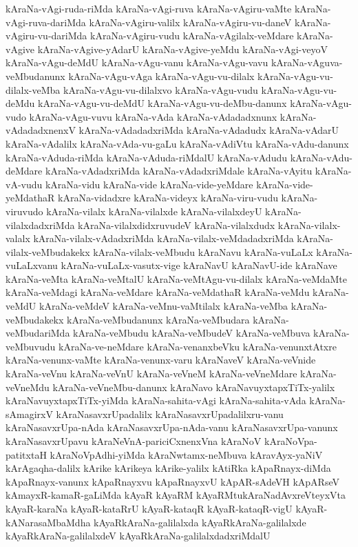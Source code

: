 {kAraNa-vAgi-ruda-riMda
kAraNa-vAgi-ruva
kAraNa-vAgiru-vaMte
kAraNa-vAgi-ruva-dariMda
kAraNa-vAgiru-valilx
kAraNa-vAgiru-vu-daneV
kAraNa-vAgiru-vu-dariMda
kAraNa-vAgiru-vudu
kAraNa-vAgilalx-veMdare
kAraNa-vAgive
kAraNa-vAgive-yAdarU
kAraNa-vAgive-yeMdu
kAraNa-vAgi-veyoV
kAraNa-vAgu-deMdU
kAraNa-vAgu-vanu
kAraNa-vAgu-vavu
kAraNa-vAguva-veMbudanunx
kAraNa-vAgu-vAga
kAraNa-vAgu-vu-dilalx
kAraNa-vAgu-vu-dilalx-veMba
kAraNa-vAgu-vu-dilalxvo
kAraNa-vAgu-vudu
kAraNa-vAgu-vu-deMdu
kAraNa-vAgu-vu-deMdU
kAraNa-vAgu-vu-deMbu-danunx
kAraNa-vAgu-vudo
kAraNa-vAgu-vuvu
kAraNa-vAda
kAraNa-vAdadadxnunx
kAraNa-vAdadadxnenxV
kAraNa-vAdadadxriMda
kAraNa-vAdadudx
kAraNa-vAdarU
kAraNa-vAdalilx
kAraNa-vAda-vu-gaLu
kAraNa-vAdiVtu
kAraNa-vAdu-danunx
kAraNa-vAduda-riMda
kAraNa-vAduda-riMdalU
kAraNa-vAdudu
kAraNa-vAdu-deMdare
kAraNa-vAdadxriMda
kAraNa-vAdadxriMdale
kAraNa-vAyitu
kAraNa-vA-vudu
kAraNa-vidu
kAraNa-vide
kAraNa-vide-yeMdare
kAraNa-vide-yeMdathaR
kAraNa-vidadxre
kAraNa-videyx
kAraNa-viru-vudu
kAraNa-viruvudo
kAraNa-vilalx
kAraNa-vilalxde
kAraNa-vilalxdeyU
kAraNa-vilalxdadxriMda
kAraNa-vilalxdidxruvudeV
kAraNa-vilalxdudx
kAraNa-vilalx-valalx
kAraNa-vilalx-vAdadxriMda
kAraNa-vilalx-veMdadadxriMda
kAraNa-vilalx-veMbudakekx
kAraNa-vilalx-veMbudu
kAraNavu
kAraNa-vuLaLx
kAraNa-vuLaLxvanu
kAraNa-vuLaLx-vasutx-vige
kAraNavU
kAraNavU-ide
kAraNave
kAraNa-veMta
kAraNa-veMtalU
kAraNa-veMtAgu-vu-dilalx
kAraNa-veMdaMte
kAraNa-veMdagi
kAraNa-veMdare
kAraNa-veMdathaR
kAraNa-veMdu
kAraNa-veMdU
kAraNa-veMdeV
kAraNa-veMnu-vaMtilalx
kAraNa-veMba
kAraNa-veMbudakekx
kAraNa-veMbudanunx
kAraNa-veMbudara
kAraNa-veMbudariMda
kAraNa-veMbudu
kAraNa-veMbudeV
kAraNa-veMbuva
kAraNa-veMbuvudu
kAraNa-ve-neMdare
kAraNa-venanxbeVku
kAraNa-venunxtAtxre
kAraNa-venunx-vaMte
kAraNa-venunx-varu
kAraNaveV
kAraNa-veVnide
kAraNa-veVnu
kAraNa-veVnU
kAraNa-veVneM
kAraNa-veVneMdare
kAraNa-veVneMdu
kAraNa-veVneMbu-danunx
kAraNavo
kAraNavuyxtapxTiTx-yalilx
kAraNavuyxtapxTiTx-yiMda
kAraNa-sahita-vAgi
kAraNa-sahita-vAda
kAraNa-sAmagirxV
kAraNasavxrUpadalilx
kAraNasavxrUpadalilxru-vanu
kAraNasavxrUpa-nAda
kAraNasavxrUpa-nAda-vanu
kAraNasavxrUpa-vanunx
kAraNasavxrUpavu
kAraNeVnA-pariciCxnenxVna
kAraNoV
kAraNoVpa-patitxtaH
kAraNoVpAdhi-yiMda
kAraNwtamx-neMbuva
kAravAyx-yaNiV
kArAgaqha-dalilx
kArike
kArikeya
kArike-yalilx
kAtiRka
kApaRnayx-diMda
kApaRnayx-vanunx
kApaRnayxvu
kApaRnayxvU
kApAR-sAdeVH
kApARseV
kAmayxR-kamaR-gaLiMda
kAyaR
kAyaRM
kAyaRMtukAraNadAvxreVteyxVta
kAyaR-karaNa
kAyaR-kataRrU
kAyaR-kataqR
kAyaR-kataqR-vigU
kAyaR-kANarasaMbaMdha
kAyaRkAraNa-galilalxda
kAyaRkAraNa-galilalxde
kAyaRkAraNa-galilalxdeV
kAyaRkAraNa-galilalxdadxriMdalU
}

